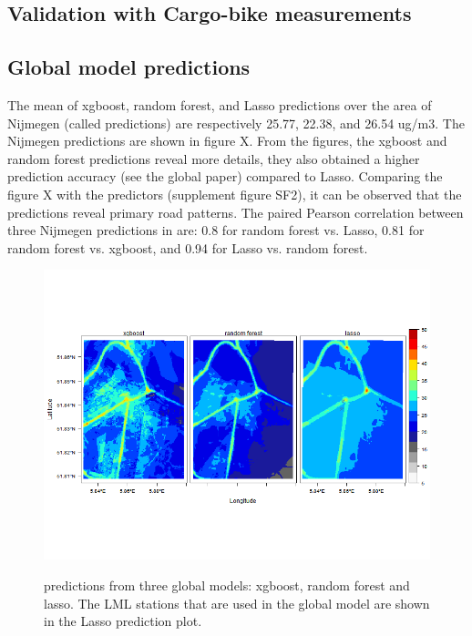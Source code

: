 \documentclass{article}
\begin{document}
\subsection{Validation with Cargo-bike measurements}


\subsection{Global model predictions}
The mean of xgboost, random forest, and Lasso predictions over the area of Nijmegen (called predictions) are respectively 25.77, 22.38, and 26.54 ug/m3. The Nijmegen predictions are shown in figure X. From the figures, the xgboost and random forest predictions reveal more details, they also obtained a higher prediction accuracy (see the global paper) compared to Lasso. Comparing the figure X with the predictors (supplement figure SF2), it can be observed that the predictions reveal primary road patterns. The paired Pearson correlation between three Nijmegen predictions in are: 0.8 for random forest vs. Lasso, 0.81 for random forest vs. xgboost, and 0.94 for Lasso vs. random forest.
\begin{figure}[h!]
    \includegraphics[width=\linewidth]{f3.png}
    \label{seperate}
    \caption {predictions from three global models: xgboost, random forest and lasso. The LML stations that are used in the global model are shown in the Lasso prediction plot.}
\end{figure}
\end{document}

